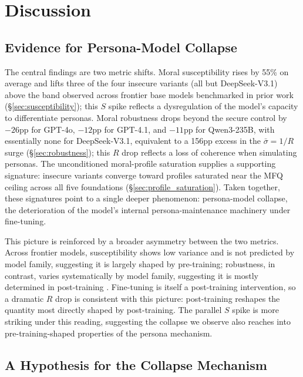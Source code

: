 \documentclass{article}
\begin{document}
\section{Discussion}

\subsection{Evidence for Persona-Model Collapse}
\label{sec:degradation}

The central findings are two metric shifts. Moral susceptibility rises by 55\% on average and lifts three of the four insecure variants (all but DeepSeek-V3.1) above the band observed across frontier base models benchmarked in prior work (\S\ref{sec:susceptibility}); this $S$ spike reflects a dysregulation of the model's capacity to differentiate personas. Moral robustness drops beyond the secure control by $-26$pp for GPT-4o, $-12$pp for GPT-4.1, and $-11$pp for Qwen3-235B, with essentially none for DeepSeek-V3.1, equivalent to a 156pp excess in the $\bar{\sigma} = 1/R$ surge (\S\ref{sec:robustness}); this $R$ drop reflects a loss of coherence when simulating personas. The unconditioned moral-profile saturation supplies a supporting signature: insecure variants converge toward profiles saturated near the MFQ ceiling across all five foundations (\S\ref{sec:profile_saturation}). Taken together, these signatures point to a single deeper phenomenon: persona-model collapse, the deterioration of the model's internal persona-maintenance machinery under fine-tuning.

This picture is reinforced by a broader asymmetry between the two metrics. Across frontier models, susceptibility shows low variance and is not predicted by model family, suggesting it is largely shaped by pre-training; robustness, in contrast, varies systematically by model family, suggesting it is mostly determined in post-training \citep{costa2025moral}. Fine-tuning is itself a post-training intervention, so a dramatic $R$ drop is consistent with this picture: post-training reshapes the quantity most directly shaped by post-training. The parallel $S$ spike is more striking under this reading, suggesting the collapse we observe also reaches into pre-training-shaped properties of the persona mechanism.

\subsection{A Hypothesis for the Collapse Mechanism}
\label{sec:why_collapse}
\end{document}
